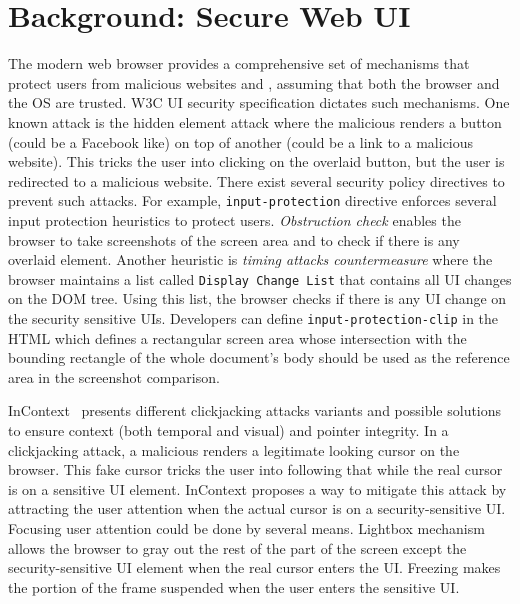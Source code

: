 \section{Background: Secure Web UI}
\label{sec:background}

The modern web browser provides a comprehensive set of mechanisms that protect users from malicious websites and \js, assuming that both the browser and the OS are trusted. W3C UI security specification \cite{w3c_spec} dictates such mechanisms. One known attack is the hidden element attack where the malicious \js renders a button (could be a Facebook like) on top of another (could be a link to a malicious website). This tricks the user into clicking on the overlaid button, but the user is redirected to a malicious website. There exist several security policy directives to prevent such attacks. For example, \texttt{input-protection} directive enforces several input protection heuristics to protect users. \emph{Obstruction check} enables the browser to take screenshots of the screen area and to check if there is any overlaid element. Another heuristic is \emph{timing attacks countermeasure} where the browser maintains a list called \texttt{Display Change List} that contains all UI changes on the DOM tree. Using this list, the browser checks if there is any UI change on the security sensitive UIs. Developers can define \texttt{input-protection-clip} in the HTML which defines a rectangular screen area whose intersection with the bounding rectangle of the whole document's body should be used as the reference area in the screenshot comparison.

InContext~\cite{huang2012clickjacking} presents different clickjacking attacks variants and possible solutions to ensure context (both temporal and visual) and pointer integrity. In a clickjacking attack, a malicious \js renders a legitimate looking cursor on the browser. This fake cursor tricks the user into following that while the real cursor is on a sensitive UI element. InContext proposes a way to mitigate this attack by attracting the user attention when the actual cursor is on a security-sensitive UI. Focusing user attention could be done by several means. Lightbox mechanism allows the browser to gray out the rest of the part of the screen except the security-sensitive UI element when the real cursor enters the UI. Freezing makes the portion of the frame suspended when the user enters the sensitive UI. %